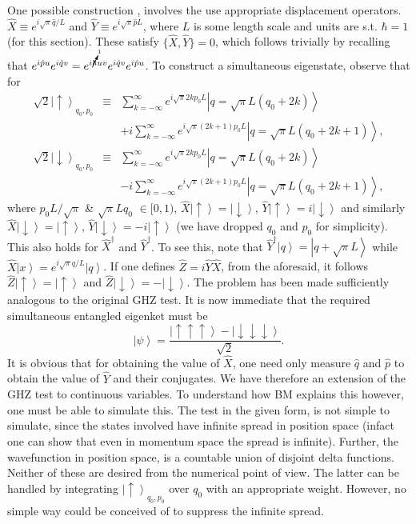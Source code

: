 One possible construction \cite{GHZcontinuous}, involves the use
appropriate displacement operators. $\hat{X}\equiv e^{i\sqrt{\pi}\hat{q}/L}$
and $\hat{Y}\equiv e^{i\sqrt{\pi}\hat{p}L}$, where $L$ is some length
scale and units are s.t. $\hbar=1$ (for this section). These satisfy
$\{\hat{X},\hat{Y}\}=0$, which follows trivially by recalling that
$e^{i\hat{p}u}e^{i\hat{q}v}=e^{i\cancelto{1}{\hbar}uv}e^{i\hat{q}v}e^{i\hat{p}u}$.
To construct a simultaneous eigenstate, observe that for 
\begin{eqnarray*}
\sqrt{2}\left|\uparrow\right\rangle _{q_{0},p_{0}} & \equiv & \sum_{k=-\infty}^{\infty}e^{i\sqrt{\pi}2kp_{0}L}\left|q=\sqrt{\pi}L\left(q_{0}+2k\right)\right\rangle \\
 &  & +i\sum_{k=-\infty}^{\infty}e^{i\sqrt{\pi}(2k+1)p_{0}L}\left|q=\sqrt{\pi}L\left(q_{0}+2k+1\right)\right\rangle ,\\
\sqrt{2}\left|\downarrow\right\rangle _{q_{0},p_{0}} & \equiv & \sum_{k=-\infty}^{\infty}e^{i\sqrt{\pi}2kp_{0}L}\left|q=\sqrt{\pi}L\left(q_{0}+2k\right)\right\rangle \\
 &  & -i\sum_{k=-\infty}^{\infty}e^{i\sqrt{\pi}(2k+1)p_{0}L}\left|q=\sqrt{\pi}L\left(q_{0}+2k+1\right)\right\rangle ,
\end{eqnarray*}
where $p_{0}L/\sqrt{\pi}$ \& $\sqrt{\pi}Lq_{0}$ $\in[0,1)$, $\hat{X}\left|\uparrow\right\rangle =\left|\downarrow\right\rangle $,
$\hat{Y}\left|\uparrow\right\rangle =i\left|\downarrow\right\rangle $
and similarly $\hat{X}\left|\downarrow\right\rangle =\left|\uparrow\right\rangle $,
$\hat{Y}\left|\downarrow\right\rangle =-i\left|\uparrow\right\rangle $
(we have dropped $q_{0}$ and $p_{0}$ for simplicity). This also
holds for $\hat{X}^{\dagger}$ and $\hat{Y}^{\dagger}$. To see this,
note that $\hat{Y}^{\dagger}\left|q\right\rangle =\left|q+\sqrt{\pi}L\right\rangle $
while $\hat{X}\left|x\right\rangle =e^{i\sqrt{\pi}q/L}\left|q\right\rangle $.
If one defines $\hat{Z}=i\hat{Y}\hat{X}$, from the aforesaid, it
follows $\hat{Z}\left|\uparrow\right\rangle =\left|\uparrow\right\rangle $
and $\hat{Z}\left|\downarrow\right\rangle =-\left|\downarrow\right\rangle $.
The problem has been made sufficiently analogous to the original GHZ
test. It is now immediate that the required simultaneous entangled
eigenket must be 
\[
\left|\psi\right\rangle =\frac{\left|\uparrow\uparrow\uparrow\right\rangle -\left|\downarrow\downarrow\downarrow\right\rangle }{\sqrt{2}}.
\]
It is obvious that for obtaining the value of $\hat{X}$, one need
only measure $\hat{q}$ and $\hat{p}$ to obtain the value of $\hat{Y}$
and their conjugates. We have therefore an extension of the GHZ test
to continuous variables. To understand how BM explains this however,
one must be able to simulate this. The test in the given form, is
not simple to simulate, since the states involved have infinite spread
in position space (infact one can show that even in momentum space
the spread is infinite). Further, the wavefunction in position space,
is a countable union of disjoint delta functions. Neither of these
are desired from the numerical point of view. The latter can be handled
by integrating $\left|\uparrow\right\rangle _{q_{0},p_{0}}$ over
$q_{0}$ with an appropriate weight. However, no simple way could
be conceived of to suppress the infinite spread.


